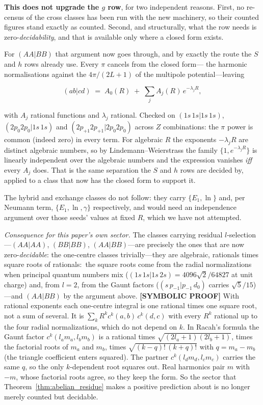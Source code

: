 \documentclass[aps,pra,twocolumn,superscriptaddress,longbibliography]{revtex4-2}
\begin{document}
\textbf{This does not upgrade the $g$ row}, for two independent reasons.
First, no re-census of the cross classes has been run with the new machinery, so
their counted figures stand exactly as counted.  Second, and structurally, what the row
needs is zero-\emph{decidability}, and that is available only where a
closed form exists.

For $(AA|BB)$ that argument now goes through, and by exactly the route the
$S$ and $h$ rows already use.  Every $\pi$ cancels from the closed form---
the harmonic normalisations against the $4\pi/(2L+1)$ of the multipole
potential---leaving

\begin{equation}
  (ab|cd) \;=\; A_0(R) \;+\; \sum_j A_j(R)\, e^{-\lambda_j R},
  \label{eq:aabb_closed_form}
\end{equation}

with $A_j$ rational functions and $\lambda_j$ rational.  Checked on
$(1s\,1s|1s\,1s)$, $(2p_0 2p_0|1s\,1s)$ and $(2p_{+1} 2p_{+1}|2p_0 2p_0)$
across $Z$ combinations: the $\pi$ power is common (indeed zero) in every
term.  For algebraic $R$ the exponents $-\lambda_j R$ are distinct
algebraic numbers, so by Lindemann--Weierstrass the family
$\{1, e^{-\lambda_j R}\}$ is linearly independent over the algebraic
numbers and the expression vanishes \emph{iff} every $A_j$ does.  That is
the same separation the $S$ and $h$ rows are decided by, applied to a
class that now has the closed form to support it.

The hybrid and exchange classes do not follow: they carry
$\{E_1, \ln\}$ and, per Neumann term, $\{E_1, \ln, \gamma\}$ respectively, and would need an
independence argument over those seeds' values at fixed $R$, which we have not attempted.

\emph{Consequence for this paper's own sector.}  The classes carrying
residual $l$-selection---$(AA|AA)$, $(BB|BB)$, $(AA|BB)$---are precisely
the ones that are now zero-\emph{decidable}: the one-centre classes
trivially---they are algebraic, rationals times square roots of rationals:\ the
square roots come from the radial normalizations when principal quantum numbers mix
($(1s\,1s|1s\,2s)=4096\sqrt2/64827$ at unit charge) and, from $l=2$, from the Gaunt factors
($(s\,p_{-1}|p_{-1}\,d_0)$ carries $\sqrt5/15$)---and $(AA|BB)$ by the argument
above.  \textbf{[SYMBOLIC PROOF]} With rational exponents each one-centre integral
is one rational times one square root, not a sum of several.  It is
$\sum_k R^k c^k(a,b)\,c^k(d,c)$ with every $R^k$ rational up to the four radial
normalizations, which do not depend on $k$.  In Racah's formula the Gaunt factor
$c^k(l_am_a,l_bm_b)$ is a rational times $\sqrt{(2l_a+1)(2l_b+1)}$, times the factorial
roots of $m_a$ and $m_b$, times $\sqrt{(k-q)!\,(k+q)!}$ with $q=m_a-m_b$ (the triangle
coefficient enters squared).  The partner $c^k(l_dm_d,l_cm_c)$ carries the same $q$,
so the only $k$-dependent root squares out.  Real harmonics pair $m$ with $-m$, whose
factorial roots agree, so they keep the form.  So the sector that Theorem~\ref{thm:abelian_residue} makes a
positive prediction about is no longer merely counted but decidable.
\end{document}
